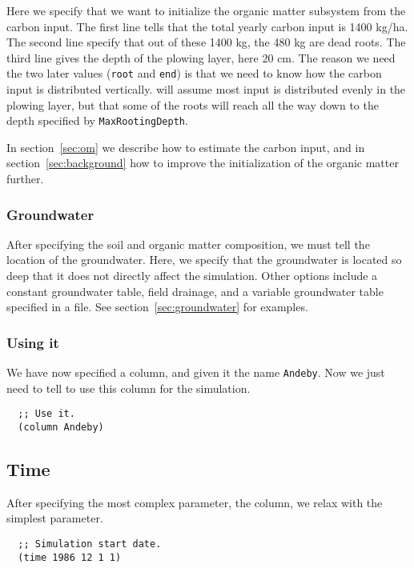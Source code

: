 \documentclass[a4paper,11pt]{article}
\begin{document}
Here we specify that we want to initialize the organic matter
subsystem from the carbon input.  The first line tells \daisy{} that the
total yearly carbon input is 1400 kg/ha.  The second line specify that
out of these 1400 kg, the 480 kg are dead roots.  The third line gives
the depth of the plowing layer, here 20 cm.  The reason we need the
two later values (\texttt{root} and \texttt{end}) is that we need to
know how the carbon input is distributed vertically.  \Daisy{} will
assume most input is distributed evenly in the plowing layer, but that
some of the roots will reach all the way down to the depth specified
by \texttt{MaxRootingDepth}.

In section~\ref{sec:om} we describe how to estimate the carbon input,
and in section~\ref{sec:background} how to improve the initialization
of the organic matter further.

\subsubsection{Groundwater}
\label{ex:groundwater}

After specifying the soil and organic matter composition, we must tell
\daisy{} the location of the groundwater.  Here, we specify that the
groundwater is located so deep that it does not directly affect the
simulation.  Other options include a constant groundwater table, field
drainage, and a variable groundwater table specified in a file.  See
section~\ref{sec:groundwater} for examples.  

\subsubsection{Using it}

We have now specified a column, and given it the name \texttt{Andeby}.
Now we just need to tell \daisy{} to use this column for the
simulation.

\begin{verbatim}
  ;; Use it.
  (column Andeby)
\end{verbatim}

\subsection{Time}

After specifying the most complex \daisy{} parameter, the column, we
relax with the simplest parameter.

\begin{verbatim}
  ;; Simulation start date.
  (time 1986 12 1 1)
\end{verbatim}
\end{document}
